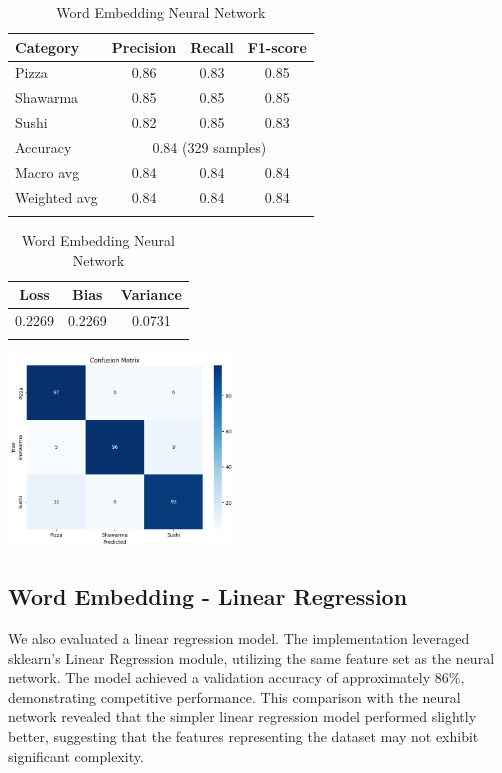 \begin{itemize}
\begin{table}[h]
    \centering
    \begin{tabular}{lccc}
        \hline
        Category     & Precision                              & Recall & F1-score \\
        \hline
        Pizza        & 0.86                                   & 0.83   & 0.85     \\
        Shawarma     & 0.85                                   & 0.85   & 0.85     \\
        Sushi        & 0.82                                   & 0.85   & 0.83     \\
        \hline
        Accuracy     & \multicolumn{3}{c}{0.84 (329 samples)}                     \\
        Macro avg    & 0.84                                   & 0.84   & 0.84     \\
        Weighted avg & 0.84                                   & 0.84   & 0.84     \\
        \hline                                                                    \\
    \end{tabular}
    \begin{tabular}{ccc}
        \hline
        Loss   & Bias   & Variance \\
        \hline
        0.2269 & 0.2269 & 0.0731   \\
        \hline                     \\
    \end{tabular}
    \includegraphics[width=0.45\textwidth]{model/neuralnetwork_confusion.png}
    \caption{Word Embedding Neural Network}
\end{table}

\subsection{Word Embedding - Linear Regression}
We also evaluated a linear regression model. The implementation leveraged sklearn's Linear Regression module, utilizing the same feature set as the neural network. The model achieved a validation accuracy of approximately 86\%, demonstrating competitive performance. This comparison with the neural network revealed that the simpler linear regression model performed slightly better, suggesting that the features representing the dataset may not exhibit significant complexity.


\end{itemize}
